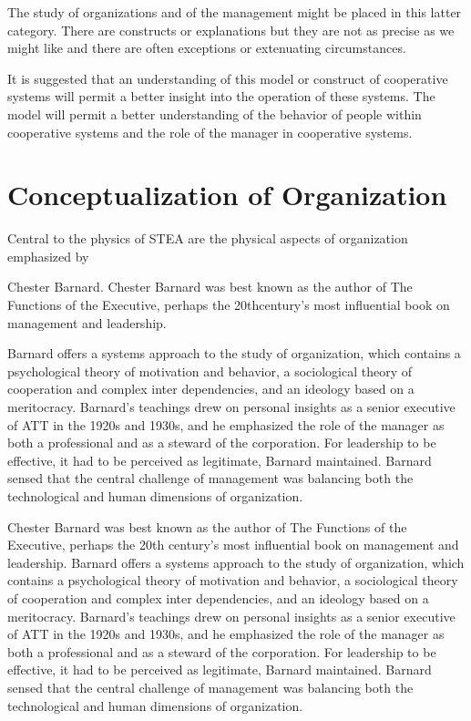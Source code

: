 The study of organizations and of the management might be placed in this latter category. There are constructs or explanations but they are not as precise as we might like and there are often exceptions or extenuating circumstances.

It is suggested that an understanding of this model or construct of cooperative systems will permit a better insight into the operation of these systems. The model will permit a better understanding of the behavior of people within cooperative systems and the role of the manager in cooperative systems.


\section{Conceptualization of Organization}

Central to the physics of  STEA are the physical aspects of organization emphasized by 

Chester Barnard. Chester Barnard was best known as the author of The Functions of the Executive, perhaps the 20thcentury’s most influential book on management and leadership. 

Barnard offers a systems approach to the study of organization, which contains a psychological theory of motivation and behavior, a sociological theory of cooperation and complex inter dependencies, and an ideology based on a meritocracy. Barnard’s teachings drew on personal insights as a senior executive of ATT in the 1920s and 1930s, and he emphasized the role of the manager as both a professional and as a steward of the corporation. For leadership to be effective, it had to be perceived as legitimate, Barnard maintained. Barnard sensed that the central challenge of management was balancing both the technological and human dimensions of organization.

Chester Barnard was best known as the author of The Functions of the Executive, perhaps the 20th century’s most influential book on management and leadership. Barnard offers a systems approach to the study of organization, which contains a psychological theory of motivation and behavior, a sociological theory of cooperation and complex inter dependencies, and an ideology based on a meritocracy. Barnard’s teachings drew on personal insights as a senior executive of ATT in the 1920s and 1930s, and he emphasized the role of the manager as both a professional and as a steward of the corporation. For leadership to be effective, it had to be perceived as legitimate, Barnard maintained. Barnard sensed that the central challenge of management was balancing both the technological and human dimensions of organization.

